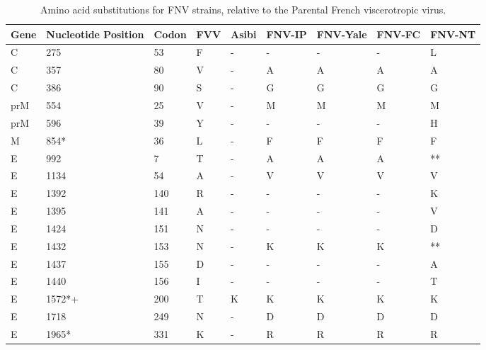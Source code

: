 
\footnotesize
\begin{longtabu} to \columnwidth {X[.75,l]X[1.75,l]X[l]X[l]X[l]X[l]X[l]X[l]X[l]}
	\caption{Amino acid substitutions for FNV strains, relative to the Parental French viscerotropic virus.}\\
	\rowfont[1]{\bfseries}
	\toprule
Gene  & Nucleotide Position & Codon & FVV & Asibi & FNV-IP & FNV-Yale & FNV-FC & FNV-NT \\ \midrule
C     & 275                 & 53    & F   & -     & -      & -        & -      & L      \\
C     & 357                 & 80    & V   & -     & A      & A        & A      & A      \\
C     & 386                 & 90    & S   & -     & G      & G        & G      & G      \\
prM   & 554                 & 25    & V   & -     & M      & M        & M      & M      \\
prM   & 596                 & 39    & Y   & -     & -      & -        & -      & H      \\
M     & 854*                & 36    & L   & -     & F      & F        & F      & F      \\
E     & 992                 & 7     & T   & -     & A      & A        & A      & **     \\
E     & 1134                & 54    & A   & -     & V      & V        & V      & V      \\
E     & 1392                & 140   & R   & -     & -      & -        & -      & K      \\
E     & 1395                & 141   & A   & -     & -      & -        & -      & V      \\
E     & 1424                & 151   & N   & -     & -      & -        & -      & D      \\
E     & 1432                & 153   & N   & -     & K      & K        & K      & **     \\
E     & 1437                & 155   & D   & -     & -      & -        & -      & A      \\
E     & 1440                & 156   & I   & -     & -      & -        & -      & T      \\
E     & 1572*+              & 200   & T   & K     & K      & K        & K      & K      \\
E     & 1718                & 249   & N   & -     & D      & D        & D      & D      \\
E     & 1965*               & 331   & K   & -     & R      & R        & R      & R      \\

\end{longtabu}
